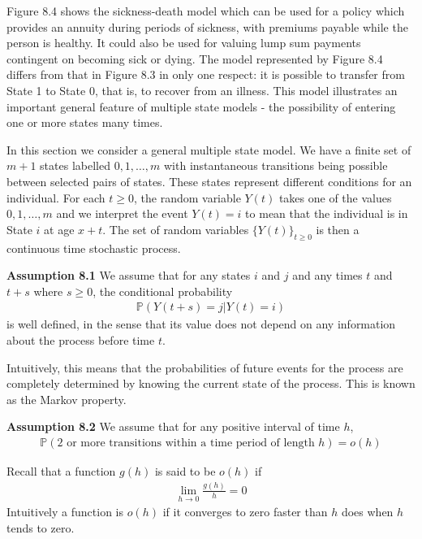 \documentclass[hidelinks, 12pt]{article}
\theoremstyle{mydefstyle}
\theoremstyle{mythmstyle}
\newcounter{prop}
\begin{document}
Figure 8.4 shows the sickness-death model which can be used for a policy which provides an annuity during periods of sickness, with premiums payable while the person is healthy. It could also be used for valuing lump sum payments contingent on becoming sick or dying. The model represented by Figure 8.4 differs from that in Figure 8.3 in only one respect: it is possible to transfer from State 1 to State 0, that is, to recover from an illness. This model illustrates an important general feature of multiple state models - the possibility of entering one or more states many times. 

In this section we consider a general multiple state model. We have a finite set of $m+1$ states labelled $0, 1, \dots, m$ with instantaneous transitions being possible between selected pairs of states. These states represent different conditions for an individual. For each $t \ge 0$, the random variable $Y(t)$ takes one of the values $0, 1, \dots, m$ and we interpret the event $Y(t) = i$ to mean that the individual is in State $i$ at age $x+t$. The set of random variables $\{Y(t)\}_{t \ge 0}$ is then a continuous time stochastic process. 

\textbf{Assumption 8.1} We assume that for any states $i$ and $j$ and any times $t$ and $t+s$ where $s \ge 0$, the conditional probability
\begin{gather*}
\mathbb{P}(Y(t+s) = j \vert Y(t) = i)
\end{gather*}
is well defined, in the sense that its value does not depend on any information about the process before time $t$.

Intuitively, this means that the probabilities of future events for the process are completely determined by knowing the current state of the process. This is known as the Markov property. 

\textbf{Assumption 8.2} We assume that for any positive interval of time $h$,
\begin{gather*}
\mathbb{P}(\mbox{2 or more transitions within a time period of length $h$}) = o(h)
\end{gather*}

Recall that a function $g(h)$ is said to be $o(h)$ if
\begin{gather*}
\lim_{h \to 0} \frac{g(h)}{h} = 0
\end{gather*}
Intuitively a function is $o(h)$ if it converges to zero faster than $h$ does when $h$ tends to zero. 
\end{document}
